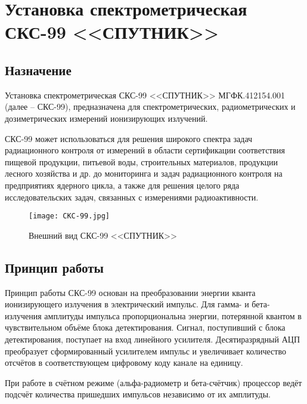 \clearpage

\section{Установка спектрометрическая СКС-99 <<СПУТНИК>>} \label{section2_5}
\subsection{Назначение} \label{2_5_1}
    Установка спектрометрическая СКС-99 <<СПУТНИК>> МГФК.412154.001 
    (далее -- СКС-99), предназначена для спектрометрических, 
    радиометрических и дозиметрических измерений ионизирующих излучений. 

    СКС-99 может использоваться для решения широкого спектра задач 
    радиационного контроля от измерений в области сертификации соответствия 
    пищевой продукции, питьевой воды, строительных материалов, продукции 
    лесного хозяйства и др. до мониторинга и задач радиационного контроля 
    на предприятиях ядерного цикла, а также для решения целого ряда 
    исследовательских задач, связанных с измерениями радиоактивности.

    \begin{figure}[ht]
		\centering
		\texttt{[image: CKC-99.jpg]}
		\caption{Внешний вид СКС-99 <<СПУТНИК>>}
	\end{figure}

\subsection{Принцип работы} \label{2_4_3}
    Принцип работы СКС-99 основан на преобразовании энергии кванта 
    ионизирующего излучения в электрический импульс. Для гамма- и бета- 
    излучения амплитуды импульса пропорциональна энергии, потерянной 
    квантом в чувствительном объёме блока детектирования. Сигнал, 
    поступивший с блока детектирования, поступает на вход линейного 
    усилителя. Десятиразрядный АЦП преобразует сформированный усилителем 
    импульс и увеличивает количество отсчётов в соответствующем цифровому 
    коду канале на единицу.

    При работе в счётном режиме (альфа-радиометр и бета-счётчик) процессор 
    ведёт подсчёт количества пришедших импульсов независимо от их 
    амплитуды.

\clearpage